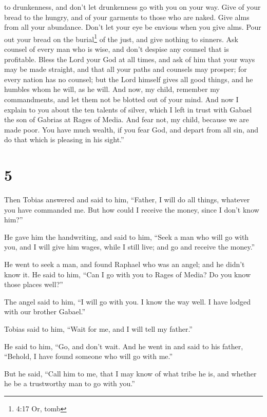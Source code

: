 to drunkenness, and don't let drunkenness go with you on your way.
 Give of your bread to the hungry, and of your garments to
those who are naked. Give alms from all your abundance. Don't let your
eye be envious when you give alms.  Pour out your bread on
the burial\footnote{4:17 Or, tomb} of the just, and give nothing to
sinners.  Ask counsel of every man who is wise, and don't
despise any counsel that is profitable.  Bless the Lord
your God at all times, and ask of him that your ways may be made
straight, and that all your paths and counsels may prosper; for every
nation has no counsel; but the Lord himself gives all good things, and
he humbles whom he will, as he will. And now, my child, remember my
commandments, and let them not be blotted out of your mind.
 And now I explain to you about the ten talents of silver,
which I left in trust with Gabael the son of Gabrias at Rages of Media.
 And fear not, my child, because we are made poor. You have
much wealth, if you fear God, and depart from all sin, and do that which
is pleasing in his sight.''

\hypertarget{section-4}{%
\section{5}\label{section-4}}

 Then Tobias answered and said to him, ``Father, I will do
all things, whatever you have commanded me.  But how could I
receive the money, since I don't know him?''

 He gave him the handwriting, and said to him, ``Seek a man
who will go with you, and I will give him wages, while I still live; and
go and receive the money.''

 He went to seek a man, and found Raphael who was an angel;
 and he didn't know it. He said to him, ``Can I go with you
to Rages of Media? Do you know those places well?''

 The angel said to him, ``I will go with you. I know the way
well. I have lodged with our brother Gabael.''

 Tobias said to him, ``Wait for me, and I will tell my
father.''

 He said to him, ``Go, and don't wait. And he went in and
said to his father, ``Behold, I have found someone who will go with
me.''

But he said, ``Call him to me, that I may know of what tribe he is, and
whether he be a trustworthy man to go with you.''

